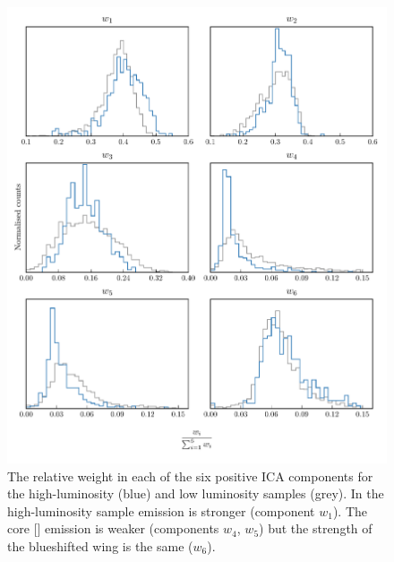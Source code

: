 \begin{figure}
    \includegraphics[width=\textwidth]{figures/chapter04/mfica_component_weights.pdf} 
    \caption{The relative weight in each of the six positive ICA components for the high-luminosity (blue) and low luminosity samples (grey). In the high-luminosity sample  emission is stronger (component $w_1$). The core [] emission is weaker (components $w_4$, $w_5$) but the strength of the blueshifted wing is the same ($w_6$).}     
    \label{fig:mfica_component_weights}
\end{figure}

